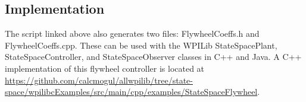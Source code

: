 \subsection{Implementation}

The script linked above also generates two files: FlywheelCoeffs.h and
FlywheelCoeffs.cpp. These can be used with the WPILib StateSpacePlant,
StateSpaceController, and StateSpaceObserver classes in C++ and Java. A C++
implementation of this flywheel controller is located at
\url{https://github.com/calcmogul/allwpilib/tree/state-space/wpilibcExamples/src/main/cpp/examples/StateSpaceFlywheel}.
